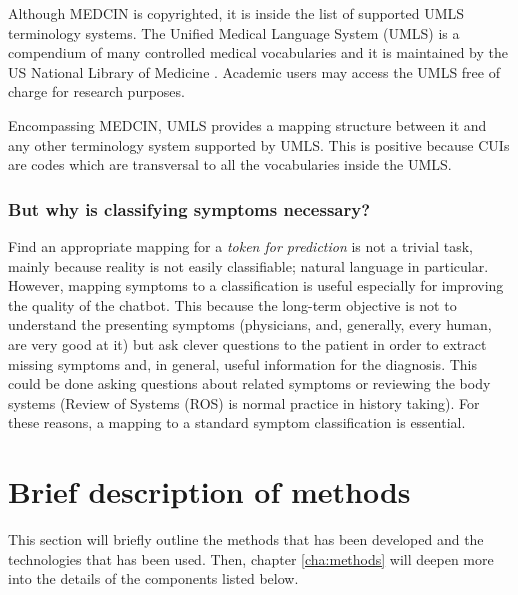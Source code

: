 Although MEDCIN is copyrighted, it is inside the list of supported UMLS terminology systems. The Unified Medical Language System (UMLS) is a compendium of many controlled medical vocabularies and it is maintained by the US National Library of Medicine \cite{umls}. Academic users may access the UMLS free of charge for research purposes.

Encompassing MEDCIN, UMLS provides a mapping structure between it and any other terminology system supported by UMLS. This is positive because CUIs are codes which are transversal to all the vocabularies inside the UMLS.

\subsubsection{But why is  classifying symptoms necessary?}
\label{sub:whyclassifying}
Find an appropriate mapping for a \textit{token for prediction} is not a trivial task, mainly because reality is not easily classifiable; natural language in particular. However, mapping symptoms to a classification is useful especially for improving the quality of the chatbot. This because the long-term objective is not to understand the presenting symptoms (physicians, and, generally, every human, are very good at it) but ask clever questions to the patient in order to extract missing symptoms and, in general, useful information for the diagnosis. This could be done asking questions about related symptoms or reviewing the body systems (Review of Systems (ROS) is normal practice in history taking). For these reasons, a mapping to a standard symptom classification is essential.

\section{Brief description of methods}
\label{sec:brief_methods}

This section will briefly outline the methods that has been developed and the technologies that has been used. Then, chapter \ref{cha:methods} will deepen more into the details of the components listed below.

